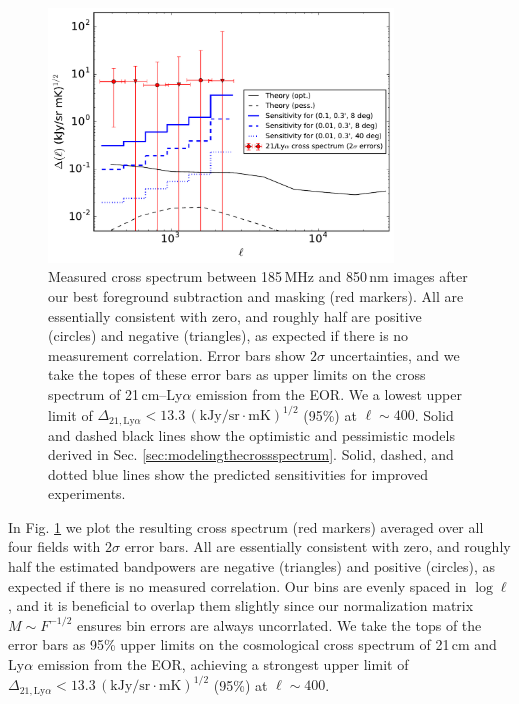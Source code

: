 \documentclass{emulateapj}
\begin{document}
\begin{figure}[h]
\centering
\includegraphics[width=3.6in]{images/mwa_atlas_xspec_with_2Dsimtheory_and_2sigma_errors_6bins.pdf}
\caption{Measured cross spectrum between 185\,MHz and 850\,nm images after our best foreground subtraction and masking (red markers). All are essentially consistent with zero, and roughly half are positive (circles) and negative (triangles), as expected if there is no measurement correlation. Error bars show $2\sigma$ uncertainties, and we take the topes of these error bars as upper limits on the cross spectrum of 21\,cm--Ly$\alpha$ emission from the EOR. We a lowest upper limit of $\Delta_{21,\text{Ly}\alpha}<13.3\,(\text{kJy/sr}\cdot \text{mK})^{1/2}$ (95\%) at $\ell\sim400$. Solid and dashed black lines show the optimistic and pessimistic models derived in Sec. \ref{sec:modelingthecrossspectrum}. Solid, dashed, and dotted blue lines show the predicted sensitivities for improved experiments.}
\label{fig:resxspec}
\end{figure}

In Fig. \ref{fig:resxspec} we plot the resulting cross spectrum (red markers) averaged over all four fields with $2\sigma$ error bars. All are essentially consistent with zero, and roughly half the estimated bandpowers are negative (triangles) and positive (circles), as expected if there is no measured correlation. Our bins are evenly spaced in $\log \ell$, and it is beneficial to overlap them slightly since our normalization matrix $M\sim F^{-1/2}$ ensures bin errors are always uncorrlated. We take the tops of the error bars as 95\% upper limits on the cosmological cross spectrum of 21\,cm and Ly$\alpha$ emission from the EOR, achieving a strongest upper limit of $\Delta_{21,\text{Ly}\alpha}<13.3\,(\text{kJy/sr}\cdot \text{mK})^{1/2}$ (95\%) at $\ell\sim400$. 
\end{document}
